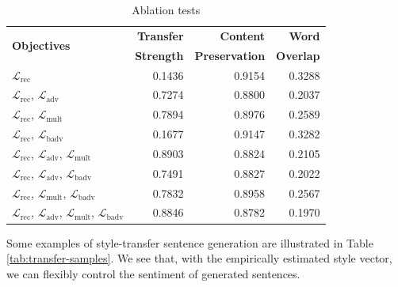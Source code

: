 \begin{table}[ht]
	\centering
	\begin{tabular}{| l | r | r | r |}
		\hline
		\multirow{2}{*}{
		\textbf{Objectives}}                                                                                     & \textbf{Transfer} & \textbf{Content}      & \textbf{Word}    \\
		                                                                                                         & \textbf{Strength} & \textbf{Preservation} & \textbf{Overlap} \\
		\hline
		\hline
		$\mathcal{L}_\text{rec}$                                                                                 & 0.1436            & 0.9154                & 0.3288           \\
		\hline
		$\mathcal{L}_\text{rec}$, $\mathcal{L}_\text{adv}$                                                       & 0.7274            & 0.8800                & 0.2037           \\
		\hline
		$\mathcal{L}_\text{rec}$, $\mathcal{L}_\text{mult}$                                                      & 0.7894            & 0.8976                & 0.2589           \\
		\hline
		$\mathcal{L}_\text{rec}$, $\mathcal{L}_\text{badv}$                                                      & 0.1677            & 0.9147                & 0.3282           \\
		\hline
		$\mathcal{L}_\text{rec}$, $\mathcal{L}_\text{adv}$, $\mathcal{L}_\text{mult}$                            & 0.8903            & 0.8824                & 0.2105           \\
		\hline
		$\mathcal{L}_\text{rec}$, $\mathcal{L}_\text{adv}$, $\mathcal{L}_\text{badv}$                            & 0.7491            & 0.8827                & 0.2022           \\
		\hline
		$\mathcal{L}_\text{rec}$, $\mathcal{L}_\text{mult}$, $\mathcal{L}_\text{badv}$                           & 0.7832            & 0.8958                & 0.2567           \\
		\hline
		$\mathcal{L}_\text{rec}$, $\mathcal{L}_\text{adv}$, $\mathcal{L}_\text{mult}$, $\mathcal{L}_\text{badv}$ & 0.8846            & 0.8782                & 0.1970           \\
		\hline
	\end{tabular}
	\caption{Ablation tests}
	\label{tab:ablation-results}
\end{table}

Some examples of style-transfer sentence generation are illustrated in Table \ref{tab:transfer-samples}. We see that, with the empirically estimated style vector, we can flexibly control the sentiment of generated sentences.

